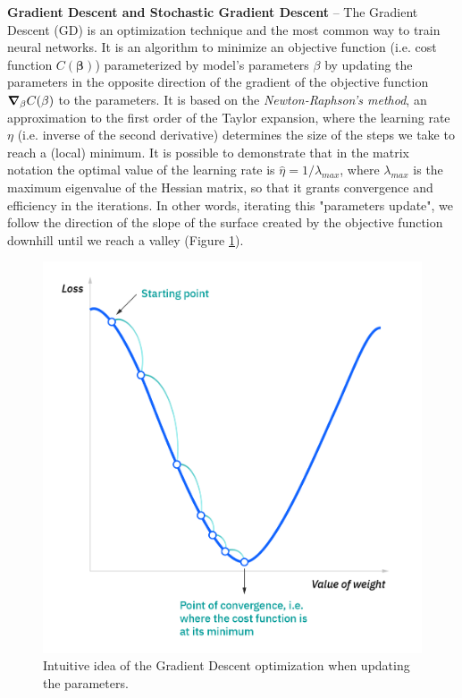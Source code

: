 \documentclass[english,notitlepage,reprint,nofootinbib]{revtex4-1}  %
\begin{document}
\textbf{Gradient Descent and Stochastic Gradient Descent} – 
The Gradient Descent (GD) is an optimization technique and the most common way to train neural networks. It is an algorithm to minimize an objective function (i.e. cost function $C(\mathbf{\beta})$) parameterized by model's parameters $\beta$ by updating the parameters in the opposite direction of the gradient of the objective function $\gradient_{\beta} C(\mathbf{\beta})$ to the parameters. It is based on the \textit{Newton-Raphson's method}, an approximation to the first order of the Taylor expansion, where the learning rate $\eta$ (i.e. inverse of the second derivative) determines the size of the steps we take to reach a (local) minimum. It is possible to demonstrate that in the matrix notation the optimal value of the learning rate is $\hat{\eta}=1 / \lambda_{max}$, where $\lambda_{max}$ is the maximum eigenvalue of the Hessian matrix, so that it grants convergence and efficiency in the iterations. In other words, iterating this "parameters update", we follow the direction of the slope of the surface created by the objective function downhill until we reach a valley (Figure \ref{fig:sgd}).
\begin{figure}[h]
    \centering 
    \includegraphics[scale=0.2]{SGD.png}
    \caption{Intuitive idea of the Gradient Descent optimization when updating the parameters.}
    \label{fig:sgd}
\end{figure}
\end{document}
